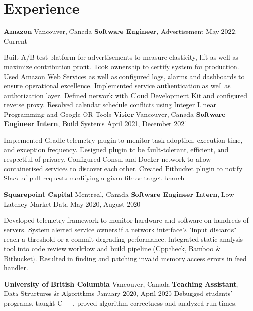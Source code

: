 \section{Experience}

\outerlist
{
    \entrybig
    {
        \textbf{Amazon}
    }
    {
        Vancouver, Canada
    }
    {
        \textbf{Software Engineer}, Advertisement
    }
    {
        May 2022, Current
    }

    \innerlist
    {
        \entry
        {
            Built A/B test platform for advertisements to measure elasticity, lift as well as maximize contribution profit. Took ownership to certify system for production. Used Amazon Web Services as well as configured logs, alarms and dashboards to ensure operational excellence.
        }
        \entry
        {
            Implemented service authentication as well as authorization layer. Defined network with Cloud Development Kit and configured reverse proxy.
        }
        \entry
        {
            Resolved calendar schedule conflicts using Integer Linear Programming and Google OR-Tools
        }
    }
    \entrybig
	{
	    \textbf{Visier}
    }
    {
        Vancouver, Canada
    }
	{
	    \textbf{Software Engineer Intern}, Build Systems
    }
    {
        April 2021, December 2021
    }
    
    \innerlist
    {
        \entry
        {
            Implemented Gradle telemetry plugin to monitor task adoption, execution time, and exception frequency. Designed plugin to be fault-tolerant, efficient, and respectful of privacy.
        }
        \entry
        {
            Configured Consul and Docker network to allow containerized services to discover each other.
        }
        \entry
        {
            Created Bitbucket plugin to notify Slack of pull requests modifying a given file or target branch.
        }
    }
    
    \entrybig
	{
	    \textbf{Squarepoint Capital}
    }
    {
        Montreal, Canada
    }
	{
	    \textbf{Software Engineer Intern}, Low Latency Market Data
    }
    {
        May 2020, August 2020
    }
    
    \innerlist
    {
	    \entry
        {
            Developed telemetry framework to monitor hardware and software on hundreds of servers. System alerted service owners if a network interface's "input discards" reach a threshold or a commit degrading performance.
        }
	    \entry
	    {
            Integrated static analysis tool into code review workflow and build pipeline (Cppcheck, Bamboo \& Bitbucket). Resulted in finding and patching invalid memory access errors in feed handler.
        }
    }

    \entrybig
	{
        \textbf{University of British Columbia}
    }
    {
        Vancouver, Canada
    }
	{
        \textbf{Teaching Assistant}, Data Structures \& Algorithms
    }
    {
        January 2020, April 2020
    }
    \innerlist
    {
        \entry
        {
            Debugged students’ programs, taught C++, proved algorithm correctness and analyzed run-times.
        }
    }
}
